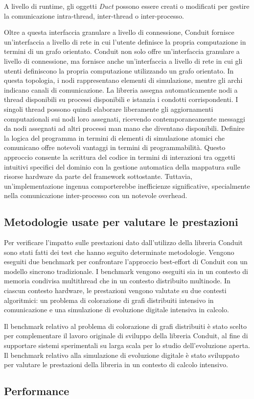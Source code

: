 \documentclass[11pt]{article}
\begin{document}
\begin{multicols*}{2}[\columnsep=1cm]
A livello di runtime, gli oggetti \textit{Duct} possono essere creati o modificati per gestire la comunicazione intra-thread, inter-thread o inter-processo.

Oltre a questa interfaccia granulare a livello di connessione, Conduit fornisce un'interfaccia a livello di rete in cui l'utente definisce la propria computazione in termini di un grafo orientato.
Conduit non solo offre un'interfaccia granulare a livello di connessione, ma fornisce anche un'interfaccia a livello di rete in cui gli utenti definiscono la propria computazione utilizzando un grafo orientato. In questa topologia, i nodi rappresentano elementi di simulazione, mentre gli archi indicano canali di comunicazione.
La libreria assegna automaticamente nodi a thread disponibili su processi disponibili e istanzia i condotti corrispondenti. I singoli thread possono quindi elaborare liberamente gli aggiornamenti computazionali sui nodi loro assegnati, ricevendo contemporaneamente messaggi da nodi assegnati ad altri processi man mano che diventano disponibili. 
Definire la logica del programma in termini di elementi di simulazione atomici che comunicano offre notevoli vantaggi in termini di programmabilità. Questo approccio consente la scrittura del codice in termini di interazioni tra oggetti intuitivi specifici del dominio  con la gestione automatica della mappatura sulle risorse hardware da parte del framework sottostante.
Tuttavia, un'implementazione ingenua comporterebbe inefficienze significative, specialmente nella comunicazione inter-processo con un notevole overhead. 

\subsection{Metodologie usate per valutare le prestazioni}
Per verificare l'impatto sulle prestazioni dato dall'utilizzo della libreria Conduit sono stati fatti dei test che hanno seguito determinate metodologie.
Vengono eseguiti due benchmark per confrontare l'approccio best-effort di Conduit con un modello sincrono tradizionale. 
I benchmark vengono eseguiti sia in un contesto di memoria condivisa multithread che in un contesto distribuito multinode. 
In ciascun contesto hardware, le prestazioni vengono valutate su due contesti algoritmici: un problema di colorazione di grafi distribuiti intensivo in comunicazione e una simulazione di evoluzione digitale intensiva in calcolo.

Il benchmark relativo al problema di colorazione di grafi distribuiti è stato scelto per complementare il lavoro originale di sviluppo della libreria Conduit, al fine di supportare sistemi sperimentali su larga scala per lo studio dell'evoluzione aperta. Il benchmark relativo alla simulazione di evoluzione digitale è stato sviluppato per valutare le prestazioni della libreria in un contesto di calcolo intensivo.

\subsection{Performance}

\end{multicols*}
\end{document}
